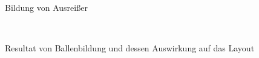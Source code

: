 \begin{figure}[t]
{	}
	\\
	\caption[Bildung von Ausreißer]{Bildung von Ausreißer}
	\label{fig_testbild2}
\end{figure}

\begin{figure}[t]
	\centering
	\hspace{1.0cm}%
	\\
	\caption[Resultat von Ballenbildung und dessen Auswirkung auf das Layout]{Resultat von Ballenbildung und dessen Auswirkung auf das Layout}
	\label{fig_testbild2}
\end{figure}
 

